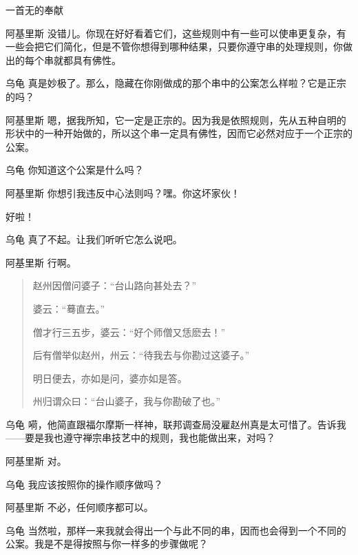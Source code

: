 \begin{dialog}{一首无的奉献\label{abcd}}
\begin{dialogue}
\item[阿基里斯]没错儿。你现在好好看着它们，这些规则中有一些可以使串更复杂，有一些会把它们简化，但是不管你想得到哪种结果，只要你遵守串的处理规则，你做出的每个串就都具有佛性。

\item[乌龟]真是妙极了。那么，隐藏在你刚做成的那个串中的公案怎么样啦？它是正宗的吗？

\item[阿基里斯]嗯，据我所知，它一定是正宗的。因为我是依照规则，先从五种自明的形状中的一种开始做的，所以这个串一定具有佛性，因而它必然对应于一个正宗的公案。

\item[乌龟]你知道这个公案是什么吗？

\item[阿基里斯]你想引我违反中心法则吗？嘿。你这坏家伙！


好啦！

\item[乌龟]真了不起。让我们听听它怎么说吧。

\item[阿基里斯]行啊。

  \begin{quote}
  赵州因僧问婆子：“台山路向甚处去？”

  婆云：“蓦直去。”

  僧才行三五步，婆云：“好个师僧又恁麽去！”

  后有僧举似赵州，州云：“待我去与你勘过这婆子。”

  明日便去，亦如是问，婆亦如是答。

  州归谓众曰：“台山婆子，我与你勘破了也。”
 \end{quote}

\item[乌龟]嗬，他简直跟福尔摩斯一样神，联邦调查局没雇赵州真是太可惜了。告诉我——要是我也遵守禅宗串技艺中的规则，我也能做出来，对吗？

\item[阿基里斯]对。

\item[乌龟]我应该按照你的操作顺序做吗？

\item[阿基里斯]不必，任何顺序都可以。

\item[乌龟]当然啦，那样一来我就会得出一个与此不同的串，因而也会得到一个不同的公案。我是不是得按照与你一样多的步骤做呢？


\end{dialogue}
\end{dialog}
